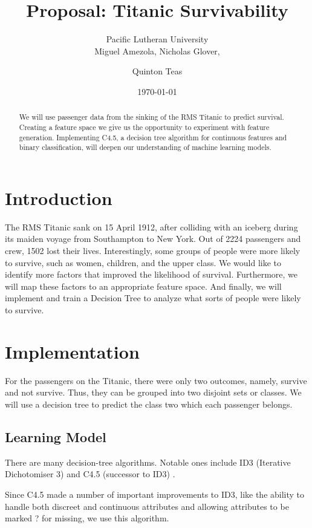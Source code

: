 \documentclass[12pt]{amsproc}
\title{Proposal: Titanic Survivability}
\author{
	Pacific Lutheran University  \\
	Miguel Amezola,
	Nicholas Glover,
	\and Quinton Teas
}
\date{\today}
\theoremstyle{definition}
\begin{document}
	
	\maketitle
		
	\begin{abstract}
	We will use passenger data from the sinking of the RMS Titanic to predict survival. Creating a feature space we give us the opportunity to experiment with feature generation. Implementing C4.5, a decision tree algorithm for continuous features and binary classification, will deepen our understanding of machine learning models.
	\end{abstract}
	
	\section{Introduction}\label{intro}
	The RMS Titanic sank on 15 April 1912, after colliding with an iceberg during its maiden voyage from Southampton to New York. Out of 2224 passengers and crew, 1502 lost their lives. Interestingly, some groups of people were more likely to survive, such as women, children, and the upper class. We would like to identify more factors that improved the likelihood of survival. Furthermore, we will map these factors to an appropriate feature space. And finally, we will implement and train a Decision Tree to analyze what sorts of people were likely to survive.
	
	\section{Implementation}\label{implementation}
	
	For the passengers on the Titanic, there were only two outcomes, namely, survive and not survive. Thus, they can be grouped into two disjoint sets or classes. We will use a decision tree to predict the class two which each passenger belongs.

	\subsection{Learning Model}\label{implementation:learning model}
	
	There are many decision-tree algorithms. Notable ones include ID3 (Iterative Dichotomiser 3) and C4.5 (successor to ID3) \cite{wikipedia:decision_tree}. 
	
	Since C4.5 made a number of important improvements to ID3, like the ability to handle both discreet and continuous attributes and allowing attributes to be marked ? for missing, we use this algorithm.
	
\end{document}
